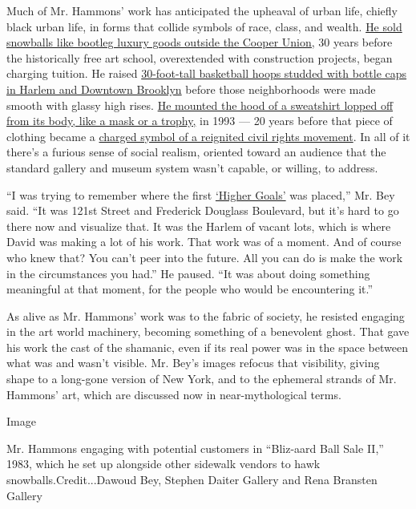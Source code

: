 Much of Mr. Hammons' work has anticipated the upheaval of urban life,
chiefly black urban life, in forms that collide symbols of race, class,
and wealth.
\href{https://aphelis.net/bliz-aard-ball-sale-david-hammons-1983/}{He
sold snowballs like bootleg luxury goods outside the Cooper Union,} 30
years before the historically free art school, overextended with
construction projects, began charging tuition. He raised
\href{https://www.publicartfund.org/view/exhibitions/5753_higher_goals}{30-foot-tall
basketball hoops studded with bottle caps in Harlem and Downtown
Brooklyn} before those neighborhoods were made smooth with glassy high
rises. \href{http://www.artcritical.com/2013/04/13/nyc-1993/}{He mounted
the hood of a sweatshirt lopped off from its body, like a mask or a
trophy,} in 1993 --- 20 years before that piece of clothing became a
\href{https://www.clydefitchreport.com/2013/07/trayvon-martin-david-hammons-and-how-to-think-about-hoods/}{charged
symbol of a reignited civil rights movement}. In all of it there's a
furious sense of social realism, oriented toward an audience that the
standard gallery and museum system wasn't capable, or willing, to
address.

``I was trying to remember where the first
\href{https://www.publicartfund.org/view/exhibitions/5753_higher_goals}{`Higher
Goals'} was placed,'' Mr. Bey said. ``It was 121st Street and Frederick
Douglass Boulevard, but it's hard to go there now and visualize that. It
was the Harlem of vacant lots, which is where David was making a lot of
his work. That work was of a moment. And of course who knew that? You
can't peer into the future. All you can do is make the work in the
circumstances you had.'' He paused. ``It was about doing something
meaningful at that moment, for the people who would be encountering
it.''

As alive as Mr. Hammons' work was to the fabric of society, he resisted
engaging in the art world machinery, becoming something of a benevolent
ghost. That gave his work the cast of the shamanic, even if its real
power was in the space between what was and wasn't visible. Mr. Bey's
images refocus that visibility, giving shape to a long-gone version of
New York, and to the ephemeral strands of Mr. Hammons' art, which are
discussed now in near-mythological terms.

Image

Mr. Hammons engaging with potential customers in ``Bliz-aard Ball Sale
II,'' 1983, which he set up alongside other sidewalk vendors to hawk
snowballs.Credit...Dawoud Bey, Stephen Daiter Gallery and Rena Bransten
Gallery

